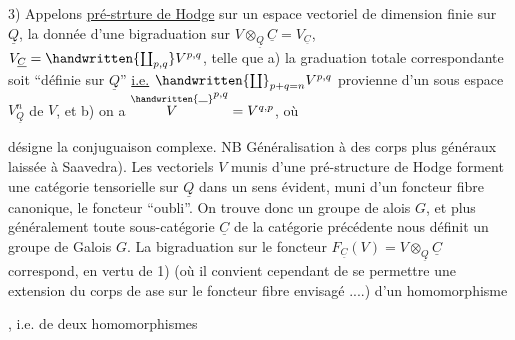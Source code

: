 3) Appelons \uline{pré-strture de Hodge} sur un espace vectoriel  de dimension finie sur $\underline{Q}$, la donnée d'une bigraduation sur $V\otimes_{\underline{Q}}\underline{C}=V_{\underline{C}}$, $V_{\underline{C}}=\handwritten{\coprod_{p,q}}V^{p,q}$, telle que a) la graduation totale correspondante soit ``définie sur $\underline{Q}$'' \uline{i.e.} $\handwritten{\coprod}_{p+q=n}V^{p,q}$ provienne d'un sous espace $V_{\underline{Q}}^n$ de $V$, et b) on a $\overset{\handwritten{\rule{.65em}{.35pt}}}{V}^{p,q}=V^{q,p}$, où  désigne la conjuguaison complexe. NB Généralisation à des corps plus généraux laissée à Saavedra). Les vectoriels $V$ munis d'une pré-structure de Hodge forment une catégorie tensorielle sur $\underline{Q}$ dans un sens évident, muni d'un foncteur fibre canonique, le foncteur ``oubli''. On trouve donc un groupe de alois $G$, et  plus généralement toute sous-catégorie $\underline{C}$ de la catégorie précédente nous définit un groupe de Galois $G$. La bigraduation sur le foncteur  $F_{\underline{C}}(V)=V\otimes_{\underline{Q}}\underline{C}$ correspond, en vertu de 1) (où il convient cependant de se permettre une extension du corps de ase sur le foncteur fibre envisagé ....) d'un homomorphisme , i.e. de deux homomorphismes 
